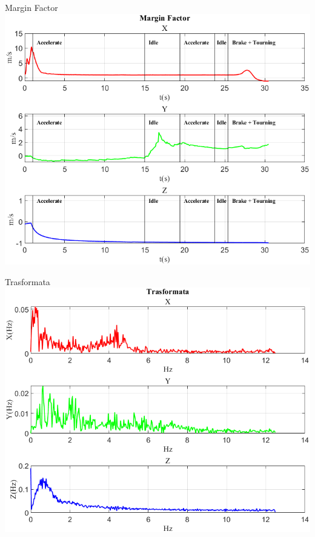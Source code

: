 \documentclass[beamer]{standalone}
\begin{document}
	\begin{frame}{{Margin Factor}}
		\centering\includegraphics[height=.8\textheight]{figure/Vel/Margin Factor}
	\end{frame}
	
	\begin{frame}{{Trasformata}}
		\centering\includegraphics[height=.8\textheight]{figure/Vel/Trasformata/Trasformata}
	\end{frame}
	
\end{document}
